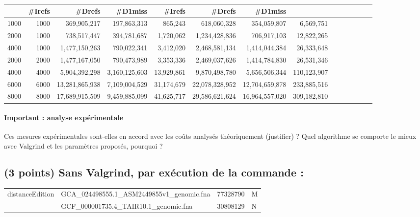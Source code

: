\documentclass[10pt,a4paper]{article}
\begin{document}
{\begin{tabular}{|r|r||r|r|r||r|r|r||r|r|r||r|r|r||}
& \#Irefs & \#Drefs & \#D1miss %
& \#Irefs & \#Drefs & \#D1miss %
\\ \hline
\hline
1000 & 1000 
& 369,905,217 & 197,863,313 & 865,243  %
& 618,060,328 & 354,059,807 & 6,569,751  %
\\ \hline
2000 & 1000 

& 738,517,447 & 394,781,687 & 1,720,062  %
& 1,234,428,836 & 706,917,103  & 12,822,265   %
\\ \hline
4000 & 1000 
& 1,477,150,263 & 790,022,341  & 3,412,020   %
& 2,468,581,134 & 1,414,044,384 & 26,333,648   %
\\ \hline
2000 & 2000 
& 1,477,167,050 & 790,473,989 & 3,353,336   %
& 2,469,037,626 & 1,414,784,830 & 26,531,346  %
\\ \hline
4000 & 4000 

& 5,904,392,298 & 3,160,125,603  & 13,929,861 %
&  9,870,498,780 & 5,656,506,344 & 110,123,907  %
\\ \hline
6000 & 6000 

& 13,281,865,938 &  7,109,004,529 & 31,174,679  %
& 22,078,328,952 & 12,704,659,878  & 233,885,516  %
\\ \hline
8000 & 8000 

& 17,689,915,509 & 9,459,885,099 & 41,625,717  %
& 29,586,621,624 & 16,964,557,020 & 309,182,810  %
\\ \hline
\hline
\end{tabular}


\paragraph{Important : analyse expérimentale}
Ces mesures expérimentales sont-elles en accord avec les coûts analysés théoriquement (justifier) ? 
Quel algorithme se comporte le mieux avec Valgrind et les paramètres proposés, pourquoi ?

\subsection{(3 points) Sans Valgrind, par exécution de la commande :}
{\tt \begin{tabular}{llll}
distanceEdition & GCA\_024498555.1\_ASM2449855v1\_genomic.fna & 77328790 & M \\
                & GCF\_000001735.4\_TAIR10.1\_genomic.fna     & 30808129 & N
\end{tabular}}

}
\end{document}
